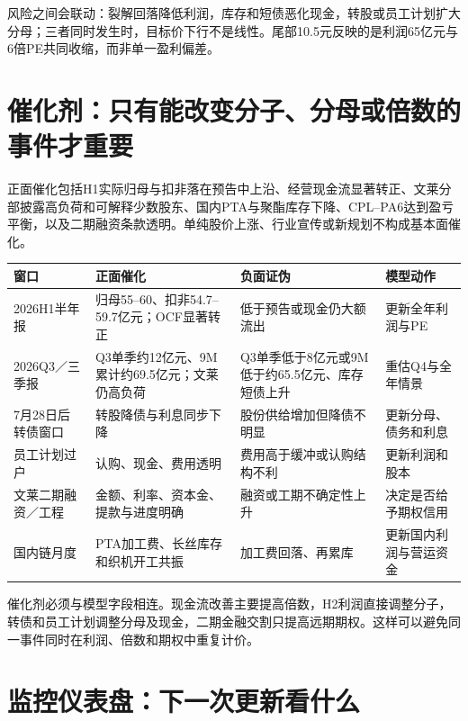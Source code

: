 风险之间会联动：裂解回落降低利润，库存和短债恶化现金，转股或员工计划扩大分母；三者同时发生时，目标价下行不是线性。尾部10.5元反映的是利润65亿元与6倍PE共同收缩，而非单一盈利偏差。

\section{催化剂：只有能改变分子、分母或倍数的事件才重要}

正面催化包括H1实际归母与扣非落在预告中上沿、经营现金流显著转正、文莱分部披露高负荷和可解释少数股东、国内PTA与聚酯库存下降、CPL--PA6达到盈亏平衡，以及二期融资条款透明。单纯股价上涨、行业宣传或新规划不构成基本面催化。

\begin{exhibitbox}[催化与证伪日历]
\small
\noindent\begin{tabularx}{\textwidth}{L{2.65cm}L{3.15cm}L{3.15cm}X}
\toprule
\textbf{窗口} & \textbf{正面催化} & \textbf{负面证伪} & \textbf{模型动作} \\
\midrule
2026H1半年报 & 归母55--60、扣非54.7--59.7亿元；OCF显著转正 & 低于预告或现金仍大额流出 & 更新全年利润与PE \\
2026Q3／三季报 & Q3单季约12亿元、9M累计约69.5亿元；文莱仍高负荷 & Q3单季低于8亿元或9M低于约65.5亿元、库存短债上升 & 重估Q4与全年情景 \\
7月28日后转债窗口 & 转股降债与利息同步下降 & 股份供给增加但降债不明显 & 更新分母、债务和利息 \\
员工计划过户 & 认购、现金、费用透明 & 费用高于缓冲或认购结构不利 & 更新利润和股本 \\
文莱二期融资／工程 & 金额、利率、资本金、提款与进度明确 & 融资或工期不确定性上升 & 决定是否给予期权信用 \\
国内链月度 & PTA加工费、长丝库存和织机开工共振 & 加工费回落、再累库 & 更新国内利润与营运资金 \\
\bottomrule
\end{tabularx}
\end{exhibitbox}

催化剂必须与模型字段相连。现金流改善主要提高倍数，H2利润直接调整分子，转债和员工计划调整分母及现金，二期金融交割只提高远期期权。这样可以避免同一事件同时在利润、倍数和期权中重复计价。

\section{监控仪表盘：下一次更新看什么}

